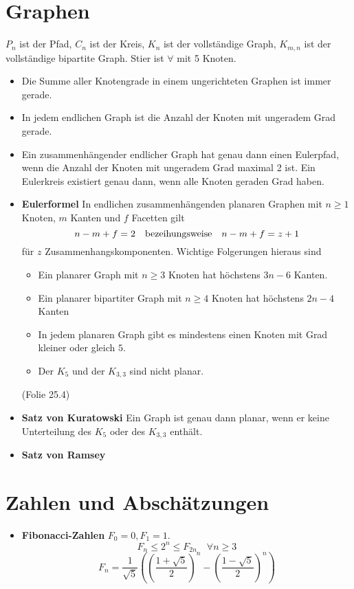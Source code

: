 \documentclass[landscape, 8pt, a4paper]{extarticle}
\begin{document}
\begin{multicols}{3}
	\section{Graphen}
	$P_n$ ist der Pfad, $C_n$ ist der Kreis, $K_n$ ist der vollständige Graph, $K_{m,n}$ ist der vollständige bipartite Graph. Stier ist $\forall$ mit 5 Knoten.

	\begin{itemize}
		\item Die Summe aller Knotengrade in einem ungerichteten Graphen ist immer gerade.
		\item In jedem endlichen Graph ist die Anzahl der Knoten mit ungeradem Grad gerade.
		\item Ein zusammenhängender endlicher Graph hat genau dann einen Eulerpfad, wenn die Anzahl der Knoten mit ungeradem Grad maximal 2 ist. Ein Eulerkreis existiert genau dann, wenn alle Knoten geraden Grad haben.
		\item \textbf{Eulerformel} In endlichen zusammenhängenden planaren Graphen mit $n\geq 1$ Knoten, $m$ Kanten und $f$ Facetten gilt
		\begin{equation*}
			n-m+f=2\text{\quad bezeihungsweise\quad}n-m+f=z+1
		\end{equation*}
		für $z$ Zusammenhangskomponenten.
		Wichtige Folgerungen hieraus sind
		\begin{itemize}
			\item Ein planarer Graph mit $n\geq 3$ Knoten hat höchstens $3n-6$ Kanten.
			\item Ein planarer bipartiter Graph mit $n\geq 4$ Knoten hat höchstens $2n-4$ Kanten
			\item In jedem planaren Graph gibt es mindestens einen Knoten mit Grad kleiner oder gleich $5$.
			\item Der $K_5$ und der $K_{3,3}$ sind nicht planar.
		\end{itemize} (Folie 25.4)

		\item \textbf{Satz von Kuratowski} Ein Graph ist genau dann planar, wenn er keine Unterteilung des $K_5$ oder des $K_{3,3}$ enthält.

		\item \textbf{Satz von Ramsey} 
	\end{itemize}



	\section{Zahlen und Abschätzungen}
	\begin{itemize}
		\item \textbf{Fibonacci-Zahlen} $F_0=0, F_1=1$. 
		\begin{equation*}
			F_{n}\leq 2^n\leq F_{2n}\quad \forall n\geq 3
		\end{equation*}
		\begin{equation*}
			F_n=\frac{1}{\sqrt 5}\left(\left(\frac{1+\sqrt 5}{2}\right)^n-\left(\frac{1-\sqrt 5}{2}\right)^n\right)
		\end{equation*}


\end{itemize}
\end{multicols}
\end{document}
